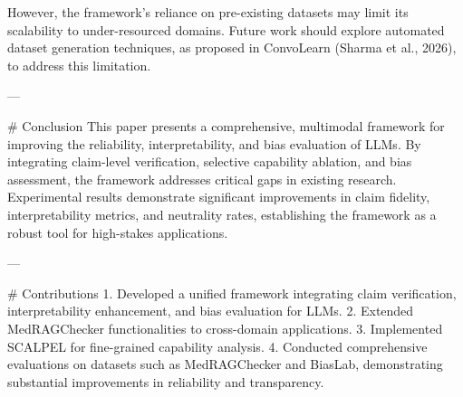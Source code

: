 However, the framework's reliance on pre-existing datasets may limit its scalability to under-resourced domains. Future work should explore automated dataset generation techniques, as proposed in ConvoLearn (Sharma et al., 2026), to address this limitation.

---

# Conclusion  
This paper presents a comprehensive, multimodal framework for improving the reliability, interpretability, and bias evaluation of LLMs. By integrating claim-level verification, selective capability ablation, and bias assessment, the framework addresses critical gaps in existing research. Experimental results demonstrate significant improvements in claim fidelity, interpretability metrics, and neutrality rates, establishing the framework as a robust tool for high-stakes applications.

---

# Contributions  
1. Developed a unified framework integrating claim verification, interpretability enhancement, and bias evaluation for LLMs.  
2. Extended MedRAGChecker functionalities to cross-domain applications.  
3. Implemented SCALPEL for fine-grained capability analysis.  
4. Conducted comprehensive evaluations on datasets such as MedRAGChecker and BiasLab, demonstrating substantial improvements in reliability and transparency.